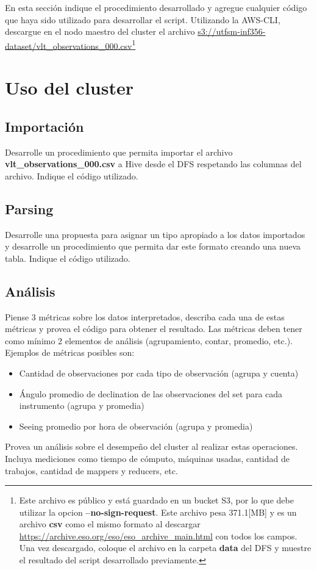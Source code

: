 \documentclass[9pt,letterpaper,twoside]{article}
\begin{document}
\begin{code}[H]
    
    \end{code}

{\color{red} En esta sección indique el procedimiento desarrollado y agregue cualquier código que haya sido utilizado para desarrollar el script.}
{\color{red} Utilizando la AWS-CLI, descargue en el nodo maestro del cluster el archivo \url{s3://utfsm-inf356-dataset/vlt_observations_000.csv}}\footnote{Este archivo es público y está guardado en un bucket S3, por lo que debe utilizar la opcion \textbf{--no-sign-request}. Este archivo pesa 371.1[MB] y es un archivo \textbf{csv} como el mismo formato al descargar \url{https://archive.eso.org/eso/eso_archive_main.html} con todos los campos. Una vez descargado, coloque el archivo en la carpeta \textbf{data} del DFS y muestre el resultado del script desarrollado previamente.}

\section{Uso del cluster}

\subsection{Importación}

{\color{red} Desarrolle un procedimiento que permita importar el archivo \textbf{vlt\_observations\_000.csv} a Hive desde el DFS respetando las columnas del archivo. Indique el código utilizado.}

\subsection{Parsing}

{\color{red} Desarrolle una propuesta para asignar un tipo apropiado a los datos importados y desarrolle un procedimiento que permita dar este formato creando una nueva tabla. Indique el código utilizado.}

\subsection{Análisis}

{\color{red} Piense 3 métricas sobre los datos interpretados, describa cada una de estas métricas y provea el código para obtener el resultado. Las métricas deben tener como mínimo 2 elementos de análisis (agrupamiento, contar, promedio, etc.). Ejemplos de métricas posibles son:
\begin{itemize}
  \item Cantidad de observaciones por cada tipo de observación (agrupa y cuenta)
  \item Ángulo promedio de declination de las observaciones del set para cada instrumento (agrupa y promedia)
  \item Seeing promedio por hora de observación (agrupa y promedia)
\end{itemize}
Provea un análisis sobre el desempeño del cluster al realizar estas operaciones. Incluya mediciones como tiempo de cómputo, máquinas usadas, cantidad de trabajos, cantidad de mappers y reducers, etc.}
\end{document}
